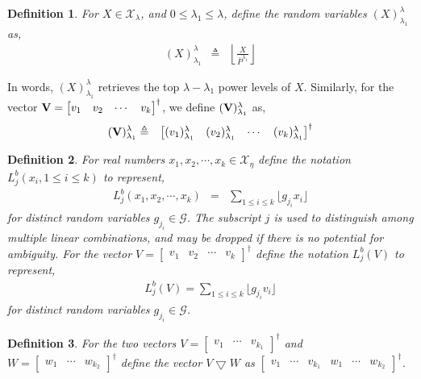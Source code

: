 \documentclass[11pt]{article}
\newtheorem{definition}{Definition}
\begin{document}
\begin {definition}\label{powerlevel} For $X\in\mathcal{X}_\lambda$, and $0\leq \lambda_1\leq\lambda$, define the random variables $(X)_{\lambda_1}^{\lambda}$ as,
 \begin{eqnarray}
(X)_{\lambda_1}^{\lambda}&\triangleq&\left \lfloor \frac{X}{\bar{P}^{\lambda_1}} \right \rfloor
\end{eqnarray}
\end {definition}
In words, $(X)_{\lambda_1}^{\lambda}$ retrieves the top $\lambda-\lambda_1$ power levels of $X$. Similarly, for  the vector ${\bf V}=\begin{bmatrix}v_1&v_2&\cdots&v_k\end{bmatrix}^\dagger$, we define $({\bf V})^{\lambda}_{\lambda_1}$ as,
 \begin{eqnarray}
({\bf V})^{\lambda}_{\lambda_1}&\triangleq&\begin{bmatrix}(v_1)^{\lambda}_{\lambda_1}&(v_2)^{\lambda}_{\lambda_1}&\cdots&(v_k)^{\lambda}_{\lambda_1}\end{bmatrix}^\dagger
\end{eqnarray}

\begin {definition}\label{deflc} For {real}  numbers $x_1,x_2,\cdots,x_k{\in\mathcal{X}_{\eta}}$ define the notation $L_j^b(x_i,1\le i\le k)$  to represent,
\begin {eqnarray}
L^b_j(x_1,x_2,\cdots,x_k )&=&\sum_{1\le i\le k} \lfloor g_{j_i}x_i\rfloor
\end{eqnarray}
for  distinct random variables $g_{j_i}\in\mathcal{G}$. The subscript $j$ is used to distinguish among multiple linear combinations, and may be dropped if there is no potential for ambiguity.  For  the vector $V=\begin{bmatrix}v_1&v_2&\cdots&v_k\end{bmatrix}^\dagger$ define the notation $L^b_j(V)$  to represent,
\begin {eqnarray}
L^b_j(V)=\sum_{1\le i\le k} \lfloor g_{j_i}v_i\rfloor
\end{eqnarray}
for  distinct random variables $g_{j_i}\in\mathcal{G}$.
\end {definition}

\begin{definition}\label{defvec} For the two vectors $V=\begin{bmatrix}v_1&\cdots&v_{k_1}\end{bmatrix}^\dagger$ and $W=\begin{bmatrix}w_1&\cdots&w_{k_2}\end{bmatrix}^\dagger$ define the vector $V\bigtriangledown W$ as $\begin{bmatrix}v_1&\cdots&v_{k_1}&w_1&\cdots&w_{k_2}\end{bmatrix}^\dagger$.
\end{definition}
\end{document}
